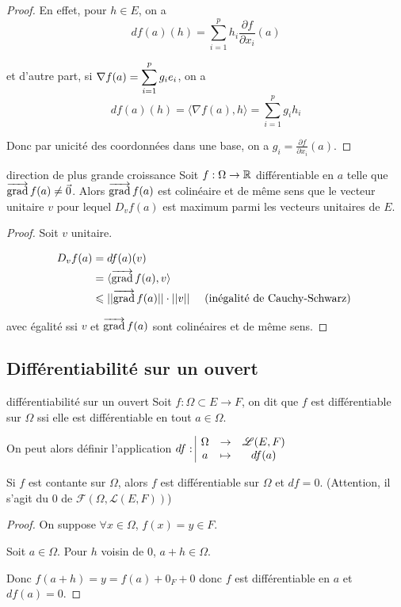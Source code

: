 \begin{proof}
    En effet, pour $h \in E$, on a 
    $$df(a)(h) = \sum_{i = 1 }^{p } h_i \frac{\partial f}{\partial x_i} (a)$$

    et d'autre part, si $\displaystyle \nabla f(a) = \sum_{i = 1 }^{p } g_i e_i$, on a 
    $$df(a)(h) = \langle \nabla f(a), h \rangle = \sum_{i = 1 }^{p } g_i h_i$$

    Donc par unicité des coordonnées dans une base, on a $g_i = \frac{\partial f}{\partial x_i} (a)$.
\end{proof}

\begin{proposition}{direction de plus grande croissance}{}
    Soit $f : \Omega \to \mathbb{R}$ différentiable en $a$ telle que 
    $\overrightarrow{\operatorname{grad}} \, f(a) \neq \vec 0$. Alors $\overrightarrow{\operatorname{grad}} \, f(a)$ est colinéaire et de même sens 
    que le vecteur unitaire $v$ pour lequel $D_v f(a)$ est maximum parmi les vecteurs unitaires de $E$.
\end{proposition}


\begin{proof}
    Soit $v$ unitaire. 

    \begin{align}
        D_v f(a) & = df(a)(v) \\
        & = \langle \overrightarrow{\operatorname{grad}} \, f(a), v \rangle \\
        & \leqslant ||\overrightarrow{\operatorname{grad}} \, f(a)|| \cdot ||v|| \quad \text{ (inégalité de Cauchy-Schwarz) } \\
    \end{align}

    avec égalité ssi $v$ et $\overrightarrow{\operatorname{grad}} \, f(a)$ sont colinéaires et de même sens.
\end{proof}

\subsection{Différentiabilité sur un ouvert}

\begin{definition}{différentiabilité sur un ouvert}{}
    Soit $f : \Omega \subset E \to F$, on dit que $f$ est différentiable sur 
    $\Omega$ ssi elle est différentiable en tout $a \in \Omega$.

    On peut alors définir l'application $df: \space \begin{array}{|ccc} \displaystyle \Omega & \to & \displaystyle \mathscr L(E, F) \\ \displaystyle a & \mapsto & \displaystyle df(a) \end{array}$
\end{definition}

\begin{exemple}
    Si $f$ est contante sur $\Omega$, alors $f$ est différentiable sur $\Omega$ et 
    $df = 0$. (Attention, il s'agit du $0$ de $\mathscr F(\Omega, \mathscr L(E, F))$)

    \begin{proof}
        On suppose $\forall x \in \Omega$, $f(x) = y \in F$. 

        Soit $a \in \Omega$. Pour $h$ voisin de $0$, $a + h \in \Omega$. 

        Donc $f(a + h) = y = f(a) + 0_F + 0 $ donc $f$ est différentiable en $a$ et $df(a) = 0$.
    \end{proof}
\end{exemple}

